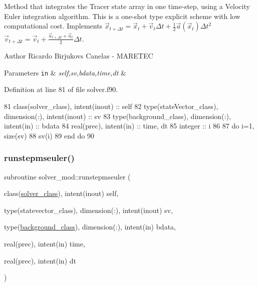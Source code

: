 Method that integrates the Tracer state array in one time-\/step, using a Velocity Euler integration algorithm. This is a one-\/shot type explicit scheme with low computational cost. Implements $ {\vec {x}}_{t+\Delta t}={\vec {x}}_{t}+{\vec {v}}_{t}\Delta t+{\frac {1}{2}}{\vec {a}}({\vec {x}}_{t})\Delta t^{2}$ $ {\vec {v}}_{t+\Delta t}={\vec {v}}_{t}+\frac{{\vec {a}}_{t+\Delta t}+{\vec {a}}_{t}}{2}\Delta t$. 

\begin{DoxyAuthor}{Author}
Ricardo Birjukovs Canelas -\/ M\+A\+R\+E\+T\+EC 
\end{DoxyAuthor}

\begin{DoxyParams}[1]{Parameters}
\mbox{\tt in}  & {\em self,sv,bdata,time,dt} & \\
\hline
\end{DoxyParams}


Definition at line 81 of file solver.\+f90.


\begin{DoxyCode}
81     \textcolor{keywordtype}{class}(solver\_class), \textcolor{keywordtype}{intent(inout)} :: self
82     \textcolor{keywordtype}{type}(stateVector\_class), \textcolor{keywordtype}{dimension(:)}, \textcolor{keywordtype}{intent(inout)} :: sv
83     \textcolor{keywordtype}{type}(background\_class), \textcolor{keywordtype}{dimension(:)}, \textcolor{keywordtype}{intent(in)} :: bdata
84     \textcolor{keywordtype}{real(prec)}, \textcolor{keywordtype}{intent(in)} :: time, dt
85     \textcolor{keywordtype}{integer} :: i
86 
87     \textcolor{keywordflow}{do} i=1, \textcolor{keyword}{size}(sv)
88         sv(i)%
89 \textcolor{keywordflow}{    end do}
90 
\end{DoxyCode}
\mbox{\label{namespacesolver__mod_ae574f8d772b89d5c3c602db278c05325}} 
\subsubsection{\texorpdfstring{runstepmseuler()}{runstepmseuler()}}
{\footnotesize\ttfamily subroutine solver\+\_\+mod\+::runstepmseuler (\begin{DoxyParamCaption}\item[{class(\mbox{\hyperlink{structsolver__mod_1_1solver__class}{solver\+\_\+class}}), intent(inout)}]{self,  }\item[{type(statevector\+\_\+class), dimension(\+:), intent(inout)}]{sv,  }\item[{type(\mbox{\hyperlink{structbackground__mod_1_1background__class}{background\+\_\+class}}), dimension(\+:), intent(in)}]{bdata,  }\item[{real(prec), intent(in)}]{time,  }\item[{real(prec), intent(in)}]{dt }\end{DoxyParamCaption})\hspace{0.3cm}{\ttfamily [private]}}



